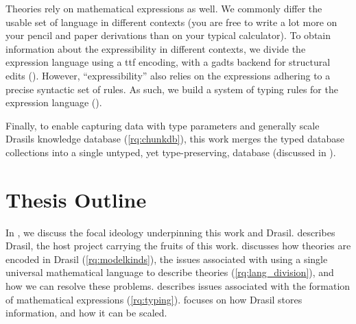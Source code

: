 Theories rely on mathematical expressions as well. We commonly differ the usable
set of language in different contexts (you are free to write a lot more on your
pencil and paper derivations than on your typical calculator). To obtain
information about the expressibility in different contexts, we divide the
expression language using a \acs{ttf} \cite{Carette2009} encoding, with a
\acsp{gadt} backend for structural edits (). However,
``expressibility'' also relies on the expressions adhering to a precise
syntactic set of rules. As such, we build a system of typing rules for the
expression language ().

Finally, to enable capturing data with type parameters and generally scale
Drasils knowledge database (\ref{rq:chunkdb}), this work merges the typed
database collections into a single untyped, yet type-preserving, database
(discussed in ).

\section{Thesis Outline}
\label{sec:intro:outline}

In , we discuss the focal ideology underpinning this work
and Drasil.  describes Drasil, the host project carrying the
fruits of this work.  discusses how theories are encoded
in Drasil (\ref{rq:modelkinds}), the issues associated with using a single
universal mathematical language to describe theories (\ref{rq:lang_division}),
and how we can resolve these problems.  describes issues
associated with the formation of mathematical expressions (\ref{rq:typing}).
 focuses on how Drasil stores information, and how it
can be scaled.
